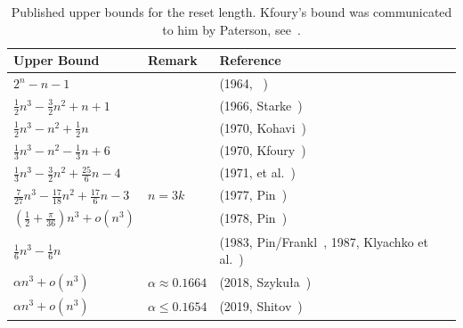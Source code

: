 \begin{table}[htb]
	\centering
	\caption[Published upper bounds on the reset length]{
		Published upper bounds for the reset length. Kfoury's bound
		was communicated to him by Paterson, see~\cite{Kfoury70}.
		}
	\label{tab:reset_length_bounds}
	
	\begin{tabular}{lll}
		\toprule
		Upper Bound & Remark & Reference \\
		\midrule
		
		$2^n - n - 1$ & & (1964, \Cerny~\cite{Cer64}) \\
		$\tfrac{1}{2}n^3 - \tfrac{3}{2} n^2 + n + 1$ & & (1966, Starke~\cite{Starke66}) \\
		$\tfrac{1}{2} n^3 - n^2 + \tfrac{1}{2} n$ & & (1970, Kohavi~\cite{Kohavi70}) \\
		$\tfrac{1}{3} n^3 - n^2 - \tfrac{1}{3} n + 6$ & & (1970, Kfoury~\cite{Kfoury70}) \\
		$\tfrac{1}{3} n^3 - \tfrac{3}{2} n^2 + \tfrac{25}{6} n - 4$
		& & (1971, \Cerny et al.~\cite{DBLP:journals/kybernetika/CernyPR71}) \\
		
		
		$\tfrac{7}{27} n^3 - \tfrac{17}{18} n^2 + \tfrac{17}{6} n - 3$
		& $n = 3k$
		& (1977, Pin~\cite{Pin77a}) \\
		
		$\left(\tfrac{1}{2} + \tfrac{\pi}{36}\right)n^3 + o(n^3)$
		& & (1978, Pin~\cite{Pin81a,DBLP:journals/eik/Pin78,Pin83a}) \\
		
		$\tfrac{1}{6}n^3 - \tfrac{1}{6}n$
		& & (1983, Pin/Frankl~\cite{Frankl82,Pin83a}, 1987, Klyachko et al.~\cite{KlyachkoRystsovSpivak87}) \\		
		$\alpha n^3 + o(n^3)$ & $\alpha \approx 0.1664$ & (2018, Szyku\l a~\cite{szykula2018}) \\
		$\alpha n^3 + o(n^3)$ & $\alpha \le 0.1654$ & (2019, Shitov~\cite{shitov2019}) \\
		
		\bottomrule
	\end{tabular}
\end{table}

